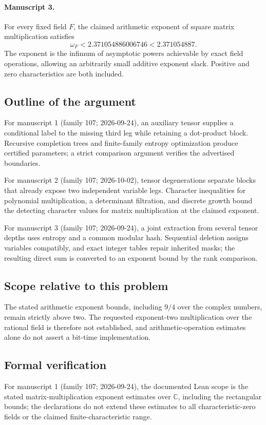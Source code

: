 \documentclass[11pt]{article}
\begin{document}
\paragraph{Manuscript 3.}
For every fixed field $F$, the claimed arithmetic exponent of square matrix multiplication satisfies
\[
 \omega_F<2.371054886006746<2.371054887.
\]
The exponent is the infimum of asymptotic powers achievable by exact field operations, allowing an arbitrarily small additive exponent slack. Positive and zero characteristics are both included.

\subsection{Outline of the argument}
For manuscript 1 (family 107; 2026-09-24), an auxiliary tensor supplies a conditional label to the missing third leg while retaining a dot-product block. Recursive completion trees and finite-family entropy optimization produce certified parameters; a strict comparison argument verifies the advertised boundaries.

For manuscript 2 (family 107; 2026-10-02), tensor degenerations separate blocks that already expose two independent variable legs. Character inequalities for polynomial multiplication, a determinant filtration, and discrete growth bound the detecting character values for matrix multiplication at the claimed exponent.

For manuscript 3 (family 107; 2026-09-24), a joint extraction from several tensor depths uses entropy and a common modular hash. Sequential deletion assigns variables compatibly, and exact integer tables repair inherited masks; the resulting direct sum is converted to an exponent bound by the rank comparison.

\subsection{Scope relative to this problem}
The stated arithmetic exponent bounds, including $9/4$ over the complex numbers, remain strictly above two. The requested exponent-two multiplication over the rational field is therefore not established, and arithmetic-operation estimates alone do not assert a bit-time implementation.

\subsection{Formal verification}
For manuscript 1 (family 107; 2026-09-24), the documented Lean scope is the stated matrix-multiplication exponent estimates over $\mathbb C$, including the rectangular bounds; the declarations do not extend these estimates to all characteristic-zero fields or the claimed finite-characteristic range.
\end{document}
